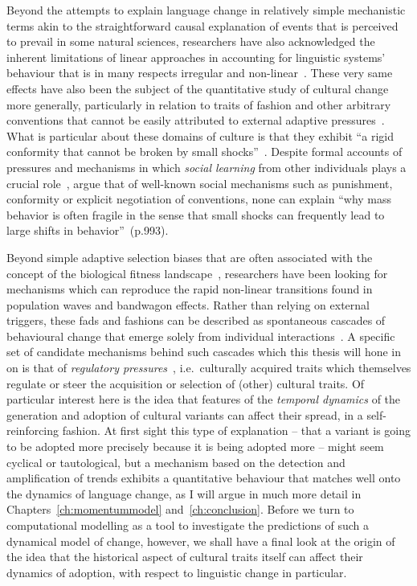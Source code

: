 Beyond the attempts to explain language change in relatively simple mechanistic terms akin to the straightforward causal explanation of events that is perceived to prevail in some natural sciences, researchers have also acknowledged the inherent limitations of linear approaches in accounting for linguistic systems' behaviour that is in many respects irregular and non-linear~\citep[see e.g.][]{Fortescue2006}.
These very same effects have also been the subject of the quantitative study of cultural change more generally, particularly in relation to traits of fashion and other arbitrary conventions that cannot be easily attributed to external adaptive pressures~\citep{Acerbi2012}. What is particular about these domains of culture is that they exhibit ``a rigid conformity that cannot be broken by small shocks''~\citep[p.991]{Bikhchandani1992}.
Despite formal accounts of pressures and mechanisms %
in which \emph{social learning} from other individuals plays a crucial role~\citep[see e.g.][]{Boyd1985}, \citeauthor{Bikhchandani1992} argue that of well-known social mechanisms such as punishment, conformity or explicit negotiation of conventions, none can explain ``why mass behavior is often fragile in the sense that small shocks can frequently lead to large shifts in behavior''~(p.993).

Beyond simple adaptive selection biases that are often associated with the concept of the biological fitness landscape~\citep{Kaplan2008,Gerlee2015}, researchers have been looking for mechanisms which can reproduce the rapid non-linear transitions found in population waves and bandwagon effects. Rather than relying on external triggers, these fads and fashions can be described as spontaneous cascades of behavioural change that emerge solely from individual interactions~\citep{Bikhchandani1998,Goldstone2008}. A specific set of candidate mechanisms behind such cascades which this thesis will hone in on is that of \emph{regulatory pressures}~\citep{Acerbi2014}, i.e.~culturally acquired traits which themselves regulate or steer the acquisition or selection of (other) cultural traits. Of particular interest here is the idea that features of the \emph{temporal dynamics} of the generation and adoption of cultural variants can affect their spread, in a self-reinforcing fashion. At first sight this type of explanation -- that a variant is going to be adopted more precisely because it is being adopted more -- might seem cyclical or tautological, but a mechanism based on the detection and amplification of trends exhibits a quantitative behaviour that matches well onto the dynamics of language change, as I will argue in much more detail in Chapters~\ref{ch:momentummodel} and~\ref{ch:conclusion}.
Before we turn to computational modelling as a tool to investigate the predictions of such a dynamical model of change, however, we shall have a final look at the origin of the idea that the historical aspect of cultural traits itself can affect their dynamics of adoption, with respect to linguistic change in particular.

